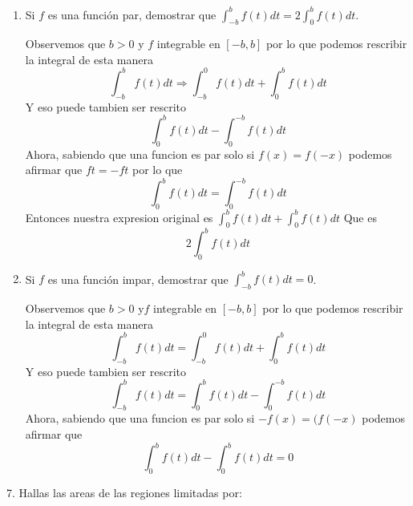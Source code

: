 \documentclass[12pt]{article}
\begin{document}
\begin{enumerate}[\hspace{9px} a)]
    \item Si $f$ es una funci\'on par, demostrar que \(\displaystyle\int_{-b}^{b}f(t)dt=2\int_{0}^{b}f(t)dt\).\medskip
    
    Observemos que \(b > 0\) y \(f\) integrable en \([-b, b]\) por lo que podemos rescribir la integral de esta manera
    \[\displaystyle\int_{-b}^{b}f(t)dt \Rightarrow \displaystyle\int_{-b}^{0}f(t)dt + \displaystyle\int_{0}^{b}f(t)dt\]
    Y eso puede tambien ser rescrito \[\displaystyle\int_{0}^{b}f(t)dt - \displaystyle\int_{0}^{-b}f(t)dt\]
    Ahora, sabiendo que una funcion es par solo si \(f(x)=f(-x)\) podemos afirmar que \(ft=-ft\) por lo que 
    \[\displaystyle\int_{0}^{b}f(t)dt=\displaystyle\int_{0}^{-b}f(t)dt\]
    Entonces nuestra expresion original es \(\displaystyle\int_{0}^{b}f(t)dt+\displaystyle\int_{0}^{b}f(t)dt\)
    Que es \[2\displaystyle\int_{0}^{b}f(t)dt\]
    
    \item Si $f$ es una funci\'on impar, demostrar que \(\displaystyle\int_{-b}^{b}f(t)dt=0\).\medskip
    
    Observemos que \(b>0\) y\(f\) integrable en \([-b,b]\) por lo que podemos rescribir la integral de esta manera
    \[\displaystyle\int_{-b}^{b}f(t)dt = \displaystyle\int_{-b}^{0}f(t)dt+\displaystyle\int_{0}^{b}f(t)dt\]
    Y eso puede tambien ser rescrito \[\int_{-b}^{b}f(t)dt=\int_{0}^{b}f(t)dt - \displaystyle\int_{0}^{-b}f(t)dt\]
     Ahora, sabiendo que una funcion es par solo si \(-f(x)=(f(-x)\) podemos afirmar que 
     \[\displaystyle\int_{0}^{b}f(t)dt-\displaystyle\int_{0}^{b}f(t)dt = 0\]

\end{enumerate}

7. Hallas las areas de las regiones limitadas por:
\end{document}
